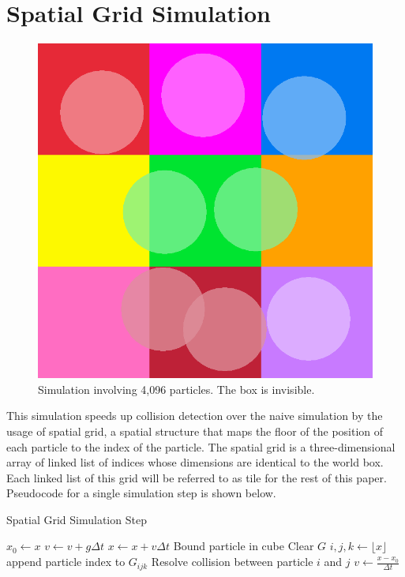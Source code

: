 \section{Spatial Grid Simulation}

\begin{figure}[H]
\centering
  \includegraphics[scale=0.20]{figures/grid.png}
  \captionsetup{justification=centering}
  \captionsetup{format=hang}
  \singlespace
  \caption{Simulation involving 4,096 particles. The box is invisible.}
\end{figure}

\indent\indent This simulation speeds up collision detection over
the naive simulation by the usage of spatial grid, a spatial 
structure that maps the floor of the position of
each particle to the index of the particle. The spatial grid is
a three-dimensional array of linked list of indices whose dimensions
are identical to the world box. Each linked list of this grid will 
be referred to as tile for the rest of this paper. Pseudocode for a 
single simulation step is shown below.

\begin{algorithm}
  \caption{Spatial Grid Simulation Step}\label{alg:cap}
  \begin{algorithmic}
      \State $x_0 \gets x$
      \State $v \gets v + g \Delta t$
      \State $x \gets x + v \Delta t$
      \State Bound particle in cube
    \EndFor
    \State Clear $G$
      \State $i, j, k \gets \lfloor x \rfloor$
      \State append particle index to $G_{ijk}$
    \EndFor
        \State Resolve collision between particle $i$ and $j$
      \EndFor
    \EndFor
      \State $v \gets \frac{x - x_0}{\Delta t}$
    \EndFor
  \end{algorithmic}
\end{algorithm}


